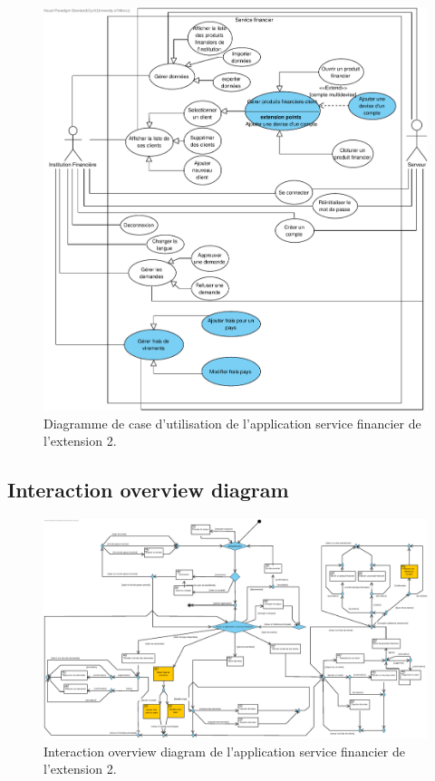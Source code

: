 \documentclass[]{report}
\begin{document}
\begin{figure}[h]
	\centering\includegraphics[scale=0.45]{img/Use Case Institution - Extension 2.pdf}
	\caption{Diagramme de case d'utilisation de l'application service financier de l'extension 2.}
\end{figure}


\newpage

\subsection{Interaction overview diagram}

\begin{figure}[h]
	\centering\includegraphics[width=\linewidth]{img/Interaction Overview Institution - Extension 2.pdf}
	\caption{Interaction overview diagram de l'application service financier de l'extension 2.}
\end{figure}

\end{document}
